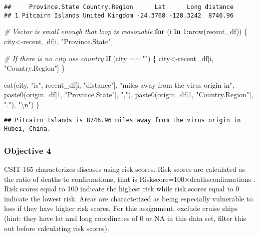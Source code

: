 \documentclass[
]{article}
\newenvironment{Shaded}{\begin{snugshade}}{\end{snugshade}}
\newcommand{\CommentTok}[1]{\textcolor[rgb]{0.56,0.35,0.01}{\textit{#1}}}
\newcommand{\ControlFlowTok}[1]{\textcolor[rgb]{0.13,0.29,0.53}{\textbf{#1}}}
\newcommand{\DecValTok}[1]{\textcolor[rgb]{0.00,0.00,0.81}{#1}}
\newcommand{\FunctionTok}[1]{\textcolor[rgb]{0.00,0.00,0.00}{#1}}
\newcommand{\NormalTok}[1]{#1}
\newcommand{\OtherTok}[1]{\textcolor[rgb]{0.56,0.35,0.01}{#1}}
\newcommand{\SpecialCharTok}[1]{\textcolor[rgb]{0.00,0.00,0.00}{#1}}
\newcommand{\StringTok}[1]{\textcolor[rgb]{0.31,0.60,0.02}{#1}}
\begin{document}
\begin{verbatim}
##     Province.State Country.Region      Lat      Long distance
## 1 Pitcairn Islands United Kingdom -24.3768 -128.3242  8746.96
\end{verbatim}

\begin{Shaded}
\begin{Highlighting}[]
\CommentTok{\# Vector is small enough that loop is reasonable}
\ControlFlowTok{for}\NormalTok{ (i }\ControlFlowTok{in} \DecValTok{1}\SpecialCharTok{:}\FunctionTok{nrow}\NormalTok{(recent\_df)) \{}
\NormalTok{  city}\OtherTok{\textless{}{-}}\NormalTok{recent\_df[i, }\StringTok{"Province.State"}\NormalTok{]}
  
  \CommentTok{\# If there is no city use country}
  \ControlFlowTok{if}\NormalTok{ (city }\SpecialCharTok{==} \StringTok{""}\NormalTok{) \{}
\NormalTok{    city}\OtherTok{\textless{}{-}}\NormalTok{recent\_df[i, }\StringTok{"Country.Region"}\NormalTok{]}
\NormalTok{  \}}
  
  \FunctionTok{cat}\NormalTok{(city, }\StringTok{"is"}\NormalTok{, recent\_df[i, }\StringTok{"distance"}\NormalTok{], }
      \StringTok{"miles away from the virus origin in"}\NormalTok{, }
      \FunctionTok{paste0}\NormalTok{(origin\_df[}\DecValTok{1}\NormalTok{, }\StringTok{"Province.State"}\NormalTok{], }\StringTok{","}\NormalTok{), }
      \FunctionTok{paste0}\NormalTok{(origin\_df[}\DecValTok{1}\NormalTok{, }\StringTok{"Country.Region"}\NormalTok{], }\StringTok{"."}\NormalTok{), }\StringTok{"}\SpecialCharTok{\textbackslash{}n}\StringTok{"}\NormalTok{)}
\NormalTok{\}}
\end{Highlighting}
\end{Shaded}

\begin{verbatim}
## Pitcairn Islands is 8746.96 miles away from the virus origin in Hubei, China.
\end{verbatim}

\hypertarget{objective-4}{%
\subsubsection{Objective 4}\label{objective-4}}

CSIT-165 characterizes diseases using risk scores. Risk scores are
calculated as the ratio of deaths to confirmations, that is
Riskscore=100×deathsconfirmations . Risk scores equal to 100 indicate
the highest risk while risk scores equal to 0 indicate the lowest risk.
Areas are characterized as being especially vulnerable to loss if they
have higher risk scores. For this assignment, exclude cruise ships
(hint: they have lat and long coordinates of 0 or NA in this data set,
filter this out before calculating risk scores).
\end{document}
